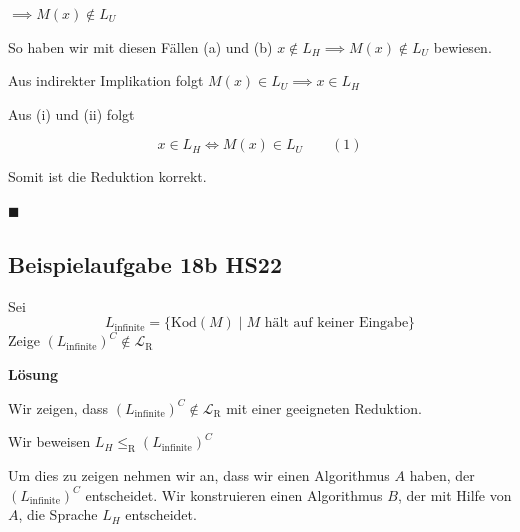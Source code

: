 \documentclass[a4paper, 11pt]{article}
\def\Lr{\mathcal{L}_\text{R}}
\begin{document}
\begin{enumerate}[label=(\roman*)]
\begin{enumerate}[label=(\alph*)]
                                    $\implies M(x) \notin L_U$
                
                                   
                                    
                                    
                                \end{enumerate}
                                
                                 So haben wir mit diesen Fällen (a) und (b) $x \notin L_H \implies M(x) \notin L_U$ bewiesen. 
                                 
                                 Aus indirekter Implikation folgt $M(x) \in L_U \implies x \in L_H$
                                     
                        \end{enumerate}
                
                   
                
                    Aus (i) und (ii) folgt 
                    
                    $$x \in L_H \iff M(x) \in L_U \qquad (1)$$
                
                    Somit ist die Reduktion korrekt.
                
                    \hspace*{0pt}\hfill$\blacksquare$
                
                
                
                    \subsection{Beispielaufgabe 18b HS22}
    
                    Sei $$L_{\text{infinite}} = \{\text{Kod}(M) \mid \text{$M$ hält auf keiner Eingabe}\}$$
                    Zeige $(L_{\text{infinite}})^C \notin \Lr$
                
                
                    \textbf{Lösung}
    
                    Wir zeigen, dass $(L_{\text{infinite}})^C \notin \Lr$ mit einer geeigneten Reduktion.
                
                    Wir beweisen $L_H \leq_{\text{R}} (L_{\text{infinite}})^C$
                
                    Um dies zu zeigen nehmen wir an, dass wir einen Algorithmus $A$ haben, der $(L_{\text{infinite}})^C$ entscheidet.
                     Wir konstruieren einen Algorithmus $B$, der mit Hilfe von $A$, die Sprache $L_H$ entscheidet. 
                     
\end{document}

